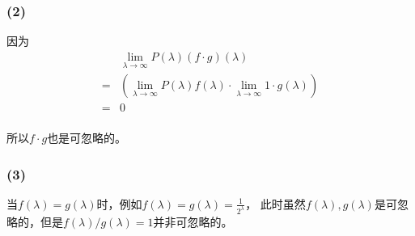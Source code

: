 \documentclass[twoside,11pt]{article}
\begin{document}
\subsubsection*{(2)}
因为
\begin{align*}
      & \lim_{\lambda \to \infty} P(\lambda)(f \cdot g)(\lambda)                                            \\
    = & (\lim_{\lambda \to \infty} P(\lambda)f(\lambda) \cdot \lim_{\lambda \to \infty} 1 \cdot g(\lambda)) \\
    = & 0                                                                                                   \\
\end{align*}

所以$f \cdot g$也是可忽略的。

\subsubsection*{(3)}
当$f(\lambda)=g(\lambda)$时，例如$f(\lambda)=g(\lambda)=\frac{1}{2^\lambda}$，
此时虽然$f(\lambda),g(\lambda)$是可忽略的，但是$f(\lambda)/g(\lambda)=1$并非可忽略的。
\end{document}
